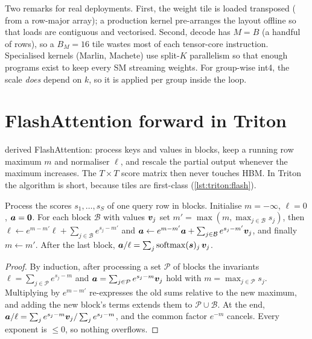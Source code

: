 Two remarks for real deployments. First, the weight tile is loaded transposed
( from a row-major  array); a production kernel pre-arranges
the layout offline so that loads are contiguous and vectorised. Second, decode has
$M=B$ (a handful of rows), so a $B_M=16$ tile wastes most of each tensor-core
instruction. Specialised kernels (Marlin, Machete) use split-$K$ parallelism so that
enough programs exist to keep every SM streaming weights. For group-wise int4, the scale
\emph{does} depend on $k$, so it is applied per group inside the loop.

\section{FlashAttention forward in Triton}\label{sec:triton:flash}
 derived FlashAttention: process keys and values in blocks, keep a
running row maximum $m$ and normaliser $\ell$, and rescale the partial output whenever
the maximum increases. The $T\times T$ score matrix then never touches HBM. In Triton
the algorithm is short, because tiles are first-class (\cref{lst:triton:flash}).

\begin{proposition}\label{prop:triton:online}
Process the scores $s_1,\dots,s_S$ of one query row in blocks. Initialise $m=-\infty$,
$\ell=0$, $\bm{a}=\bm{0}$. For each block $\mathcal B$ with values $\bm{v}_j$ set
$m'=\max(m,\max_{j\in\mathcal B}s_j)$, then
$\ell\leftarrow e^{m-m'}\ell+\sum_{j\in\mathcal B}e^{s_j-m'}$ and
$\bm{a}\leftarrow e^{m-m'}\bm{a}+\sum_{j\in\mathcal B}e^{s_j-m'}\bm{v}_j$, and finally
$m\leftarrow m'$. After the last block, $\bm{a}/\ell=\sum_j\operatorname{softmax}(\bm{s})_j\,\bm{v}_j$.
\end{proposition}
\begin{proof}
By induction, after processing a set $\mathcal P$ of blocks the invariants
$\ell=\sum_{j\in\mathcal P}e^{s_j-m}$ and $\bm{a}=\sum_{j\in\mathcal P}e^{s_j-m}\bm{v}_j$
hold with $m=\max_{j\in\mathcal P}s_j$. Multiplying by $e^{m-m'}$ re-expresses the old
sums relative to the new maximum, and adding the new block's terms extends them to
$\mathcal P\cup\mathcal B$. At the end, $\bm{a}/\ell=\sum_je^{s_j-m}\bm{v}_j/\sum_je^{s_j-m}$,
and the common factor $e^{-m}$ cancels. Every exponent is $\le 0$, so nothing
overflows.
\end{proof}

